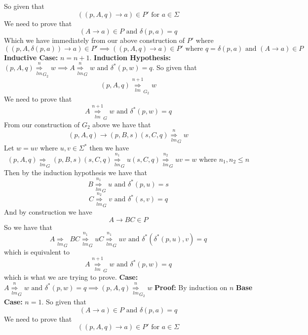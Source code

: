 \documentclass[12pt]{article}
\begin{document}
\medskip \newline
So given that
$$((p,A,q) \rightarrow a) \in P' \text{ for } a\in \Sigma$$
We need to prove that
$$ (A \rightarrow a) \in P \text{ and } \delta(p,a) = q$$
Which we have immediately from our above construction of $P'$ where
$$((p,A,\delta(p,a)) \rightarrow a) \in P' \implies
((p,A,q) \rightarrow a) \in P' \text{ where } q=\delta(p,a) \text{ and }
(A\rightarrow a) \in P$$
\newline \textbf{Inductive Case: } $n = n+1$.
\newline \textbf{Induction Hypothesis: }
$(p,A,q) \underset{lm}{\overset{n}{\Longrightarrow}}_{G_2} w
\implies A \underset{lm}{\overset{n}{\Longrightarrow}}_{G} w
\text{ and } \delta^*(p,w) = q$.
\medskip \newline
So given that
$$(p,A,q) \underset{lm}{\overset{n+1}{\Longrightarrow}}_{G_2} w$$
We need to prove that
$$A \underset{lm}{\overset{n+1}{\Longrightarrow}}_{G} w
\text{ and } \delta^*(p,w) = q$$
From our construction of $G_2$ above we have that
$$(p,A,q) \rightarrow (p,B,s)(s,C,q)
\underset{lm}{\overset{n}{\Longrightarrow}}_{G} w$$
Let $w=uv$ where $u,v\in \Sigma^*$ then we have
$$ (p,A,q) \underset{lm}{\Longrightarrow}_{G} (p,B,s)(s,C,q)
\underset{lm}{\overset{n_1}{\Longrightarrow}}_{G} u(s,C,q)
\underset{lm}{\overset{n_2}{\Longrightarrow}}_{G} uv = w
\text{ where } n_1,n_2 \le n $$
Then by the induction hypothesis we have that
$$B \underset{lm}{\overset{n_1}{\Longrightarrow}}_{G} u
\text{ and } \delta^*(p,u) = s$$
$$C \underset{lm}{\overset{n_2}{\Longrightarrow}}_{G} v
\text{ and } \delta^*(s,v) = q$$
And by construction we have
$$A\rightarrow BC \in P$$
So we have that
$$A \underset{lm}{\Longrightarrow}_{G} BC
\underset{lm}{\overset{n_1}{\Longrightarrow}}_{G} uC
\underset{lm}{\overset{n_1}{\Longrightarrow}}_{G} uv
\text{ and } \delta^*(\delta^*(p,u),v) = q$$
which is equivalent to
$$A \underset{lm}{\overset{n+1}{\Longrightarrow}}_{G} w
\text{ and } \delta^*(p,w) = q$$
which is what we are trying to prove.
\medskip \newline
\textbf{Case: } $A \underset{lm}{\overset{n}{\Longrightarrow}}_{G} w
\text{ and } \delta^*(p,w) = q \implies
(p,A,q) \underset{lm}{\overset{n}{\Longrightarrow}}_{G_2} w$
\newline \textbf{Proof: } By induction on $n$
\newline \textbf{Base Case: } $n = 1$.
\medskip \newline
So given that
$$ (A \rightarrow a) \in P \text{ and } \delta(p,a) = q$$
We need to prove that
$$((p,A,q) \rightarrow a) \in P' \text{ for } a\in \Sigma$$
\end{document}
